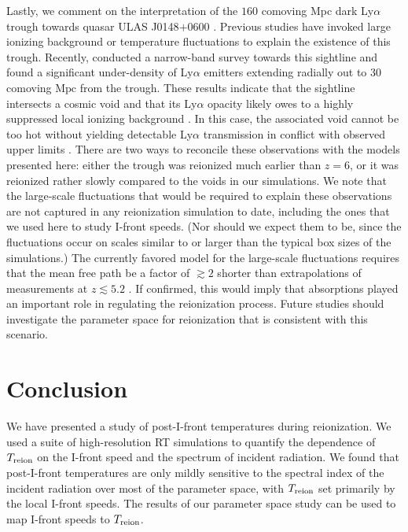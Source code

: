 \documentclass[twocolumn]{aastex62}
\newcommand{\Treion}{T_{\rm reion}}
\newcommand{\Mpc}{\mathrm{Mpc}}
\begin{document}
Lastly, we comment on the interpretation of the $160$ comoving Mpc dark Ly$\alpha$ trough towards quasar ULAS J0148$+$0600 \citep{2015MNRAS.447.3402B}.  Previous studies have invoked large ionizing background \citep{2016MNRAS.460.1328D, 2017MNRAS.465.3429C} or temperature fluctuations \citep{2015ApJ...813L..38D} to explain the existence of this trough.  Recently, \cite{2018arXiv180308932B} conducted a narrow-band survey towards this sightline and found a significant under-density of Ly$\alpha$ emitters extending radially out to $30$ comoving $\Mpc$ from the trough.  These results indicate that the sightline intersects a cosmic void and that its Ly$\alpha$ opacity likely owes to a highly suppressed local ionizing background \citep{2017arXiv170808927D}.   In this case, the associated void cannot be too hot without yielding detectable Ly$\alpha$ transmission in conflict with observed upper limits \citep{2015ApJ...813L..38D}.  There are two ways to reconcile these observations with the models presented here: either the trough was reionized much earlier than $z=6$, or it was reionized rather slowly compared to the voids in our simulations.  We note that the large-scale fluctuations that would be required to explain these observations are not captured in any reionization simulation to date, including the ones that we used here to study I-front speeds. (Nor should we expect them to be, since the fluctuations occur on scales similar to or larger than the typical box sizes of the simulations.)  The currently favored model for the large-scale fluctuations requires that the mean free path be a factor of $\gtrsim 2$ shorter than extrapolations of measurements at $z\lesssim5.2$ \citep{2016MNRAS.460.1328D, 2018MNRAS.473..560D}.  If confirmed, this would imply that absorptions played an important role in regulating the reionization process.  Future studies should investigate the parameter space for reionization that is consistent with this scenario. 
 

\section{Conclusion}
\label{sec:conclusion}

We have presented a study of post-I-front temperatures during reionization.  We used a suite of high-resolution RT simulations to quantify the dependence of $\Treion$ on the I-front speed and the spectrum of incident radiation.  We found that post-I-front temperatures are only mildly sensitive to the spectral index of the incident radiation over most of the parameter space, with $\Treion$ set primarily by the local I-front speeds.  The results of our parameter space study can be used to map I-front speeds to $\Treion$. 
 
\end{document}

